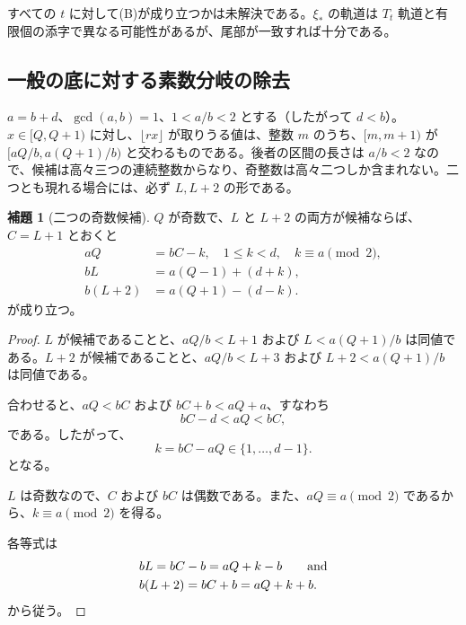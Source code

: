 \documentclass[11pt,reqno]{amsart}
\theoremstyle{definition}
\newtheorem{lemma}[theorem]{補題}
\theoremstyle{definition}
\theoremstyle{remark}
\begin{document}
すべての \(t\) に対して(B)が成り立つかは未解決である。\(\xi_*\) の軌道は \(T_t\) 軌道と有限個の添字で異なる可能性があるが、尾部が一致すれば十分である。

\subsection{一般の底に対する素数分岐の除去}\label{sec:C.5}

\(a=b+d\)、\(\gcd(a,b)=1\)、\(1<a/b<2\) とする（したがって \(d<b\)）。\(x\in[Q,Q+1)\) に対し、\(\lfloor rx\rfloor\) が取りうる値は、整数 \(m\) のうち、\([m,m+1)\) が \([aQ/b,a(Q+1)/b)\) と交わるものである。後者の区間の長さは \(a/b<2\) なので、候補は高々三つの連続整数からなり、奇整数は高々二つしか含まれない。二つとも現れる場合には、必ず \(L,L+2\) の形である。

\begin{samepage}
\begin{lemma}[二つの奇数候補]\leavevmode\label{thm:59}
\(Q\) が奇数で、\(L\) と \(L+2\) の両方が候補ならば、\(C=L+1\) とおくと
\[
\begin{aligned}
aQ&=bC-k,\quad 1\le k<d,\quad k\equiv a\pmod2,\\
bL&=a(Q-1)+(d+k),\\
b(L+2)&=a(Q+1)-(d-k).
\end{aligned}
\]
が成り立つ。
\label{thm-end:59}
\end{lemma}
\end{samepage}

\begin{proof}\leavevmode\label{proof:59}
\(L\) が候補であることと、\(aQ/b<L+1\) および \(L<a(Q+1)/b\) は同値である。\(L+2\) が候補であることと、\(aQ/b<L+3\) および \(L+2<a(Q+1)/b\) は同値である。

合わせると、\(aQ<bC\) および \(bC+b<aQ+a\)、すなわち
\[
bC-d<aQ<bC,
\]
である。したがって、
\[
k=bC-aQ\in\{1,\ldots,d-1\}.
\]
となる。

\(L\) は奇数なので、\(C\) および \(bC\) は偶数である。また、\(aQ\equiv a\pmod2\) であるから、\(k\equiv a\pmod2\) を得る。

各等式は
\[
\begin{aligned}
&bL=bC-b=aQ+k-b\qquad \text{and}\\
&b(L+2)=bC+b=aQ+k+b.
\end{aligned}\qedhere
\]
から従う。
\end{proof}
\end{document}
